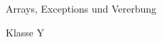 \documentclass{../preamble}
\begin{document}
\begin{task}[credit = \stars{3}{3}]{Arrays, Exceptions und Vererbung}
\begin{subtask*}{Klasse Y}
        \begin{solution}
            
        \end{solution}
    \end{subtask*}
\end{task}
\end{document}
